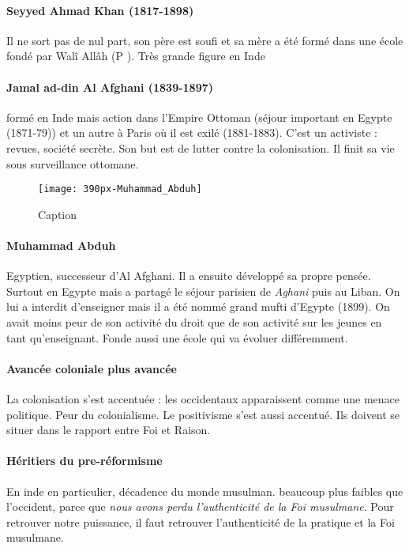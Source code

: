    \paragraph{Seyyed Ahmad Khan (1817-1898)} Il ne sort pas de nul part, son père est soufi et sa mère a été formé dans une école fondé par Walî Allâh (P \pageref{Theo:waliAllah}). Très grande figure en Inde
   
   \paragraph{Jamal ad-din Al Afghani (1839-1897)} formé en Inde mais action dans l'Empire Ottoman (séjour important en Egypte (1871-79)) et un autre à Paris où il est exilé (1881-1883). C'est un activiste  : revues, société secrète. Son but est de lutter contre la colonisation. Il finit sa vie sous surveillance ottomane.
   
   \begin{figure}
       \centering
       \texttt{[image: 390px-Muhammad\_Abduh]}
       \caption{Caption}
       \label{fig:my_label}
   \end{figure}
    \paragraph{Muhammad Abduh} Egyptien, successeur d'Al Afghani. Il a ensuite développé sa propre pensée. Surtout en Egypte mais a partagé le séjour parisien de \textit{Aghani} puis au Liban. On lui a interdit d'enseigner mais il a été nommé grand mufti d'Egypte (1899). On avait moins peur de son activité du droit que de son activité sur les jeunes en tant qu'enseignant. Fonde aussi une école qui va évoluer différemment. 
    
    \paragraph{Avancée coloniale plus avancée} La colonisation s'est accentuée : les occidentaux apparaissent comme une menace politique. Peur du colonialisme. Le positivisme s'est aussi accentué. Ils doivent se situer dans le rapport entre Foi et Raison. 
   
   \paragraph{Héritiers du pre-réformisme} En inde en particulier, décadence du monde musulman. beaucoup plus faibles que l'occident, parce que \textit{nous avons perdu l'authenticité de la Foi musulmane}. Pour retrouver notre puissance, il faut retrouver l'authenticité de la pratique et la Foi musulmane.
   
